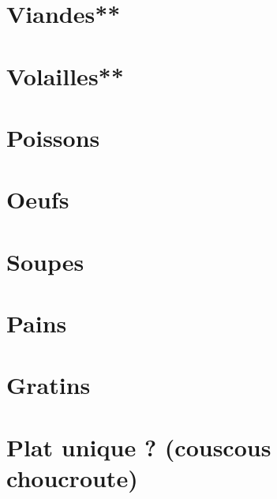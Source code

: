 \documentclass[A4paper,twoside, 12pt]{book}
\begin{document}
	\chapter{Viandes**}









	\chapter{Volailles**}






	
	\chapter{Poissons}
	
	\chapter{Oeufs}
	\chapter{Soupes}








	\chapter{Pains}

	\chapter{Gratins}
	\chapter{Plat unique ? (couscous choucroute)}



		
\end{document}
